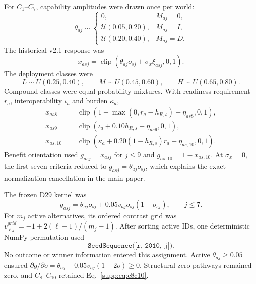 \documentclass[runningheads]{llncs}
\newcommand{\clip}{\operatorname{clip}}
\begin{document}
For $C_1$--$C_7$, capability amplitudes were drawn once per world:
\begin{equation}
\theta_{aj}\sim
\begin{cases}
0,&M_{aj}=0,\\
\mathcal U(0.05,0.20),&M_{aj}=I,\\
\mathcal U(0.20,0.40),&M_{aj}=D.
\end{cases}
\label{supp:eq:effectbands}
\end{equation}
The historical v2.1 response was
\begin{equation}
x_{asj}=\clip\!\left(\theta_{aj}o_{sj}+\sigma_x\xi_{asj},0,1\right).
\label{supp:eq:v21}
\end{equation}
The deployment classes were
\begin{equation}
L\sim U(0.25,0.40),\qquad
M\sim U(0.45,0.60),\qquad
H\sim U(0.65,0.80).
\label{supp:eq:deploymentclasses}
\end{equation}
Compound classes were equal-probability mixtures. With readiness
requirement $r_a$, interoperability $\iota_a$ and burden $\kappa_a$,
\begin{align}
x_{as8}&=\clip\!\left(1-\max(0,r_a-h_{R,s})+\eta_{as8},0,1\right),\nonumber\\
x_{as9}&=\clip\!\left(\iota_a+0.10h_{R,s}+\eta_{as9},0,1\right),\nonumber\\
x_{as,10}&=\clip\!\left(\kappa_a+0.20(1-h_{R,s})r_a+\eta_{as,10},0,1\right).
\label{supp:eq:c8c10}
\end{align}
Benefit orientation used $g_{asj}=x_{asj}$ for $j\le9$ and
$g_{as,10}=1-x_{as,10}$. At $\sigma_x=0$, the first seven criteria reduced to
$g_{asj}=\theta_{aj}o_{sj}$, which explains the exact normalization cancellation in the main
paper.

The frozen D29 kernel was
\begin{equation}
g_{asj}=\theta_{aj}o_{sj}+0.05v_{aj}o_{sj}(1-o_{sj}),\qquad j\le7.
\label{supp:eq:d29}
\end{equation}
For $m_j$ active alternatives, its ordered contrast grid was
$v^{grid}_{\ell j}=-1+2(\ell-1)/(m_j-1)$. After sorting active IDs, one deterministic NumPy
permutation used
\begin{equation}
\texttt{SeedSequence([r, 2010, j])}.
\label{supp:eq:d29seedsequence}
\end{equation}
No outcome or
winner information entered this assignment. Active $\theta_{aj}\ge0.05$ ensured
$\partial g/\partial o=\theta_{aj}+0.05v_{aj}(1-2o)\ge0$. Structural-zero pathways remained
zero, and $C_8$--$C_{10}$ retained Eq.~\eqref{supp:eq:c8c10}.
\end{document}
